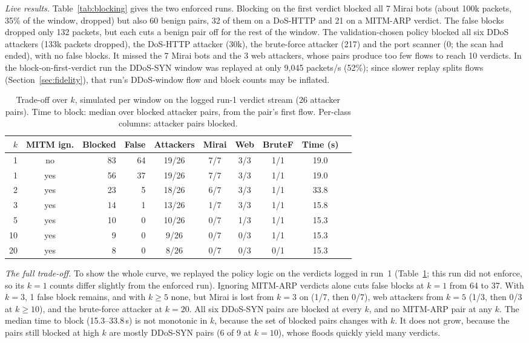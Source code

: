 \emph{Live results.} Table~\ref{tab:blocking} gives the two enforced runs. Blocking on the first verdict blocked all 7 Mirai bots (about 100k packets, 35\% of the window, dropped) but also 60 benign pairs, 32 of them on a DoS-HTTP and 21 on a MITM-ARP verdict. The false blocks dropped only 132 packets, but each cuts a benign pair off for the rest of the window. The validation-chosen policy blocked all six DDoS attackers (133k packets dropped), the DoS-HTTP attacker (30k), the brute-force attacker (217) and the port scanner (0; the scan had ended), with no false blocks. It missed the 7 Mirai bots and the 3 web attackers, whose pairs produce too few flows to reach 10 verdicts. In the block-on-first-verdict run the DDoS-SYN window was replayed at only 9,045 packets/s (52\%); since slower replay splits flows (Section~\ref{sec:fidelity}), that run's DDoS-window flow and block counts may be inflated.

\begin{table}[t]
\centering
\caption{Trade-off over $k$, simulated per window on the logged run-1 verdict stream (26 attacker pairs). Time to block: median over blocked attacker pairs, from the pair's first flow. Per-class columns: attacker pairs blocked.}
\label{tab:kcurve}
\footnotesize
\setlength{\tabcolsep}{2.2pt}
\begin{tabular}{rcrrcccccr}
\hline
$k$ & MITM ign. & Blocked & False & Attackers & Mirai & Web & BruteF & Time (s) \\
\hline
1  & no  & 83 & 64 & 19/26 & 7/7 & 3/3 & 1/1 & 19.0 \\
1  & yes & 56 & 37 & 19/26 & 7/7 & 3/3 & 1/1 & 19.0 \\
2  & yes & 23 &  5 & 18/26 & 6/7 & 3/3 & 1/1 & 33.8 \\
3  & yes & 14 &  1 & 13/26 & 1/7 & 3/3 & 1/1 & 15.8 \\
5  & yes & 10 &  0 & 10/26 & 0/7 & 1/3 & 1/1 & 15.3 \\
10 & yes &  9 &  0 &  9/26 & 0/7 & 0/3 & 1/1 & 15.3 \\
20 & yes &  8 &  0 &  8/26 & 0/7 & 0/3 & 0/1 & 15.3 \\
\hline
\end{tabular}
\end{table}

\emph{The full trade-off.} To show the whole curve, we replayed the policy logic on the verdicts logged in run~1 (Table~\ref{tab:kcurve}; this run did not enforce, so its $k=1$ counts differ slightly from the enforced run). Ignoring MITM-ARP verdicts alone cuts false blocks at $k=1$ from 64 to 37. With $k=3$, 1 false block remains, and with $k\ge5$ none, but Mirai is lost from $k=3$ on (1/7, then 0/7), web attackers from $k=5$ (1/3, then 0/3 at $k\ge10$), and the brute-force attacker at $k=20$. All six DDoS-SYN pairs are blocked at every $k$, and no MITM-ARP pair at any $k$. The median time to block (15.3--33.8\,s) is not monotonic in $k$, because the set of blocked pairs changes with $k$. It does not grow, because the pairs still blocked at high $k$ are mostly DDoS-SYN pairs (6 of 9 at $k=10$), whose floods quickly yield many verdicts.

